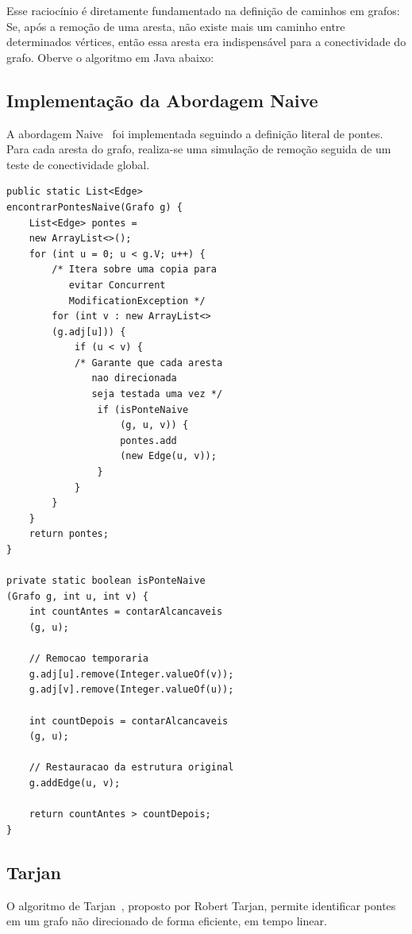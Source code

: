 \documentclass{sbc2023}%
\begin{document}
Esse raciocínio é diretamente fundamentado na definição de caminhos em grafos: Se, após a remoção de uma aresta, não existe mais um caminho entre determinados vértices, então essa aresta era indispensável para a conectividade do grafo.
 Oberve o algoritmo em Java abaixo:

 \subsection{Implementação da Abordagem Naive}

A abordagem Naive~\cite{cormen2022Naive} foi implementada seguindo a definição literal de pontes. Para cada aresta do grafo, realiza-se uma simulação de remoção seguida de um teste de conectividade global.

\begin{lstlisting}[caption={Implementação da verificação de pontes via força bruta (Naive\cite{cormen2022Naive}).}, label={lst:naive}]
public static List<Edge> 
encontrarPontesNaive(Grafo g) {
    List<Edge> pontes = 
    new ArrayList<>();
    for (int u = 0; u < g.V; u++) {
        /* Itera sobre uma copia para 
           evitar Concurrent
           ModificationException */
        for (int v : new ArrayList<>
        (g.adj[u])) {
            if (u < v) { 
            /* Garante que cada aresta 
               nao direcionada 
               seja testada uma vez */
                if (isPonteNaive
                    (g, u, v)) {
                    pontes.add
                    (new Edge(u, v));
                }
            }
        }
    }
    return pontes;
}

private static boolean isPonteNaive
(Grafo g, int u, int v) {
    int countAntes = contarAlcancaveis
    (g, u);

    // Remocao temporaria
    g.adj[u].remove(Integer.valueOf(v));
    g.adj[v].remove(Integer.valueOf(u));

    int countDepois = contarAlcancaveis
    (g, u);

    // Restauracao da estrutura original
    g.addEdge(u, v);

    return countAntes > countDepois;
}
\end{lstlisting}

\subsection{Tarjan}

O algoritmo de Tarjan~\cite{tarjan1972dfs}, proposto por Robert Tarjan, permite identificar pontes em um grafo não direcionado de forma eficiente, em tempo linear.
\end{document}
